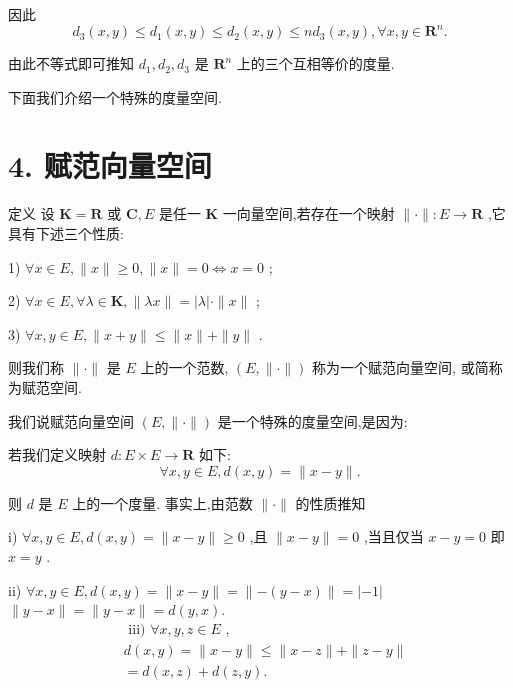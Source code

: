 因此
$${d}_{3}\left( {x,y}\right)  \leq  {d}_{1}\left( {x,y}\right)  \leq  {d}_{2}\left( {x,y}\right)  \leq  n{d}_{3}\left( {x,y}\right) ,\forall x,y \in  {\mathbf{R}}^{n}.$$

由此不等式即可推知 ${d}_{1},{d}_{2},{d}_{3}$ 是 ${\mathbf{R}}^{n}$ 上的三个互相等价的度量.

下面我们介绍一个特殊的度量空间.

\section*{4. 赋范向量空间}

定义 设 $\mathbf{K} = \mathbf{R}$ 或 $\mathbf{C},E$ 是任一 $\mathbf{K}$ 一向量空间,若存在一个映射 $\parallel  \cdot  \parallel  : E \rightarrow  \mathbf{R}$ ,它具有下述三个性质:

1) $\forall x \in  E,\parallel x\parallel  \geq  0,\parallel x\parallel  = 0 \Leftrightarrow  x = 0$ ;

2) $\forall x \in  E,\forall \lambda  \in  \mathbf{K},\parallel {\lambda x}\parallel  = \left| \lambda \right|  \cdot  \parallel x\parallel$ ;

3) $\forall x,y \in  E,\parallel x + y\parallel  \leq  \parallel x\parallel  + \parallel y\parallel$ .

则我们称 $\parallel  \cdot  \parallel$ 是 $E$ 上的一个范数, $\left( {E,\parallel  \cdot  \parallel }\right)$ 称为一个赋范向量空间, 或简称为赋范空间.

我们说赋范向量空间 $\left( {E,\parallel  \cdot  \parallel }\right)$ 是一个特殊的度量空间,是因为:

若我们定义映射 $d : E \times  E \rightarrow  \mathbf{R}$ 如下:
$$\forall x,y \in  E,d\left( {x,y}\right)  = \parallel x - y\parallel .$$

则 $d$ 是 $E$ 上的一个度量. 事实上,由范数 $\parallel  \cdot  \parallel$ 的性质推知

i) $\forall x,y \in  E,d\left( {x,y}\right)  = \parallel x - y\parallel  \geq  0$ ,且 $\parallel x - y\parallel  = 0$ ,当且仅当 $x - y = 0$ 即 $x = y$ .

ii) $\forall x,y \in  E,d\left( {x,y}\right)  = \parallel x - y\parallel  = \parallel  - \left( {y - x}\right) \parallel  = \left| {-1}\right|$  $\parallel y - x\parallel  = \parallel y - x\parallel  = d\left( {y,x}\right) .$
\begin{align*}
	&\text{ iii) }\forall x,y,z \in  E\text{ , }\\
	&d\left( {x,y}\right)  = \parallel x - y\parallel  \leq  \parallel x - z\parallel  + \parallel z - y\parallel\\
	&= d\left( {x,z}\right)  + d\left( {z,y}\right) .
\end{align*}

